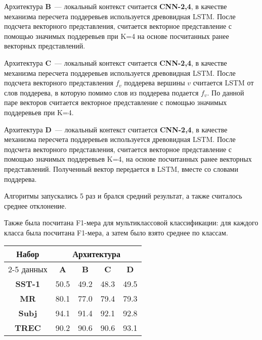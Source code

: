 Архитектура \textbf{B}~--- локальный контекст считается \textbf{CNN-2,4}, в качестве механизма пересчета поддеревьев используется древовидная LSTM. После подсчета векторного представления, считается векторное представление с помощью значимых поддеревьев при K=4 на основе посчитанных ранее векторных представлений.

Архитектура \textbf{C}~--- локальный контекст считается \textbf{CNN-2,4}, в качестве механизма пересчета поддеревьев используется древовидная LSTM. После подсчета векторного представления $f_v$ поддерева вершины $v$ считается LSTM от слов поддерева, в которую помимо слов из поддерева подается $f_v$. По данной паре векторов считается векторное представление с помощью значимых поддеревьев при K=4.

Архитектура \textbf{D}~--- локальный контекст считается \textbf{CNN-2,4}, в качестве механизма пересчета поддеревьев используется древовидная LSTM. После подсчета векторного представления, считается векторное представление с помощью значимых поддеревьев K=4, на основе посчитанных ранее векторных представлений. Полученный вектор передается в LSTM, вместе со словами поддерева.

Алгоритмы запускались 5 раз и брался средний результат, а также считалось среднее отклонение.

Также была посчитана F1-мера для мультиклассовой классификации: для каждого класса была посчитана F1-мера, а затем было взято среднее по классам.

\vspace{5mm}
\begin{minipage}{\linewidth}
 \label{tab:title} 
\begin{tabular}{|c|c|c|c|c|}
\hline
\multirow{2}{*}{Набор}   &             \multicolumn{4}{c|}{Архитектура} \\ \cline{2-5} 
     данных              & \textbf{A}  & \textbf{B} & \textbf{C} & \textbf{D} \\ \hline
\textbf{SST-1}           & 50.5        & 49.2       & 48.3       & 49.5     \\ \hline
\textbf{MR}              & 80.1        & 77.0       & 79.4       & 79.3     \\ \hline
\textbf{Subj}            & 94.1        & 91.4       & 92.1       & 92.8     \\ \hline
\textbf{TREC}            & 90.2        & 90.6       & 90.6       & 93.1     \\ \hline
\end{tabular}
\end{minipage}
\vspace{5mm}

